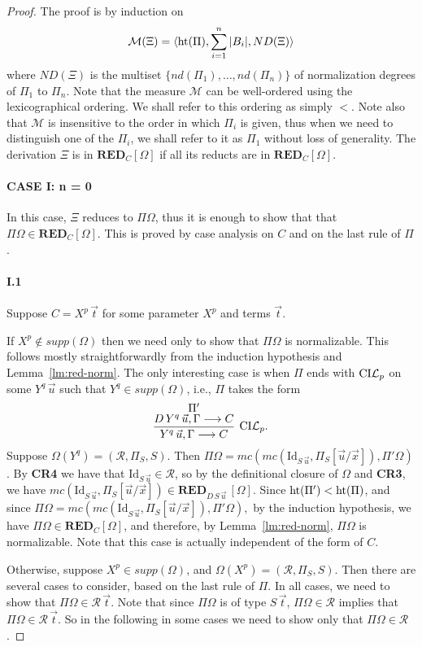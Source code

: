 \documentclass[preprint]{elsarticle}
\def\Mscr{{\mathcal M}}
\def\Rscr{{\mathcal R}}
\newcommand{\Seq}[2]{#1\longrightarrow #2}
\newcommand{\coindLP}{{\rm CI}{\cal L}_p}
\newcommand{\measure}[1]{{\rm ht}(#1)}
\def\RED{{\mathbf{RED}}}
\def\idrv{{\mathrm{Id}}}
\begin{document}
\begin{proof}
  The proof is by induction on
$$
\Mscr(\Xi) = \langle \measure{\Pi}, \sum_{i=1}^n |B_i|,
ND(\Xi) \rangle
$$
where $ND(\Xi)$ is the multiset $\{nd(\Pi_1),\ldots,nd(\Pi_n) \}$
of normalization degrees of $\Pi_1$ to $\Pi_n$.
Note that the measure $\Mscr$ can be well-ordered using the
lexicographical ordering. We shall refer to this ordering as simply
$<$.  Note also that $\Mscr$ is insensitive to the order in which
$\Pi_i$ is given, thus when we need to distinguish one of the $\Pi_i$,
we shall refer to it as $\Pi_1$ without loss of generality.  The
derivation $\Xi$ is in $\RED_C[\Omega]$ if all its reducts are in
$\RED_C[\Omega]$.
 
\paragraph{\bf CASE I: n = 0} 
In this case, $\Xi$ reduces to $\Pi\Omega$, thus it is enough to show
that that $\Pi\Omega \in \RED_C[\Omega]$.  This is proved by case
analysis on $C$ and on the last rule of $\Pi$.

\paragraph{\bf I.1} Suppose $C = X^p \,\vec t$ for some parameter
$X^p$ and terms $\vec t$.


If $X^p \not \in supp(\Omega)$ then we need only to show that
$\Pi\Omega$ is normalizable. This follows mostly straightforwardly
from the induction hypothesis and Lemma~\ref{lm:red-norm}. The only
interesting case is when $\Pi$ ends with $\coindLP$ on some $Y^q\,\vec
u$ such that $Y^q \in supp(\Omega)$, i.e., $\Pi$ takes the form
$$
\infer[\coindLP.]  {\Seq {Y^q\,\vec u, \Gamma}{C}} { \deduce{\Seq
    {D\,Y^q\,\vec u, \Gamma}{C}}{\Pi'} }
$$
Suppose $\Omega(Y^q) = (\Rscr, \Pi_S,S)$. 
Then $\Pi\Omega = mc(mc(\idrv_{S\,\vec u}, \Pi_S[\vec u/\vec x]), \Pi'\Omega)$. 
By {\bf CR4} we have that $\idrv_{S\,\vec u} \in \Rscr$, so by the
definitional closure of $\Omega$ and \textbf{CR3}, we have $mc(\idrv_{S\,\vec u},
\Pi_S[\vec u/\vec x]) \in \RED_{D\,S\,\vec u}\, [\Omega]$.  Since
$\measure{\Pi'} < \measure{\Pi}$, and since $\Pi\Omega =
mc(mc(\idrv_{S\,\vec u}, \Pi_S[\vec u/\vec x]),\Pi'\Omega),$ by the
induction hypothesis, we have $\Pi\Omega \in \RED_C[\Omega]$, and
therefore, by Lemma~\ref{lm:red-norm}, $\Pi\Omega$ is normalizable.
Note that this case is actually independent of the form of $C$.

Otherwise, suppose $X^p \in supp(\Omega)$, and $\Omega(X^p) =
(\Rscr,\Pi_S,S)$.  Then there are several cases to consider, based on
the last rule of $\Pi$.  In all cases, we need to show that $\Pi\Omega
\in \Rscr\,\vec t$.  Note that since $\Pi\Omega$ is of type $S\,\vec
t$, $\Pi\Omega \in \Rscr$ implies that $\Pi\Omega \in \Rscr\,\vec t$.
So in the following in some cases we need to show only that
$\Pi\Omega\in\Rscr$.


\end{proof}
\end{document}
